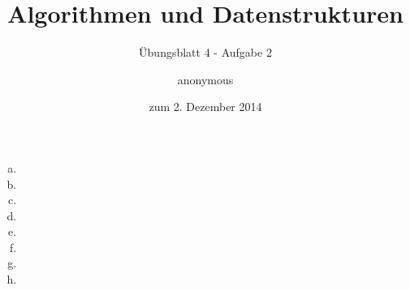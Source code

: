 \documentclass[a4paper]{scrartcl}
\title{Algorithmen und Datenstrukturen}
\subtitle{Übungsblatt 4 - Aufgabe 2}
\author{
    anonymous
}
\date{zum 2. Dezember 2014}
\begin{document}
\maketitle

\begin{enumerate}[(a)]
    \item

    \item

    \item

    \item

    \item

    \item

    \item

    \item

\end{enumerate}
\end{document}
